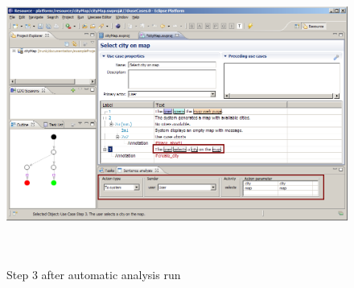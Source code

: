 \begin{figure}[ht]
  \centering
  \includegraphics[height=280pt]{images/manual-analysis/step3-automatic-after}
  \caption{Step 3 after automatic analysis run}
  \label{fig:reprotoolUCEditor}
\end{figure}